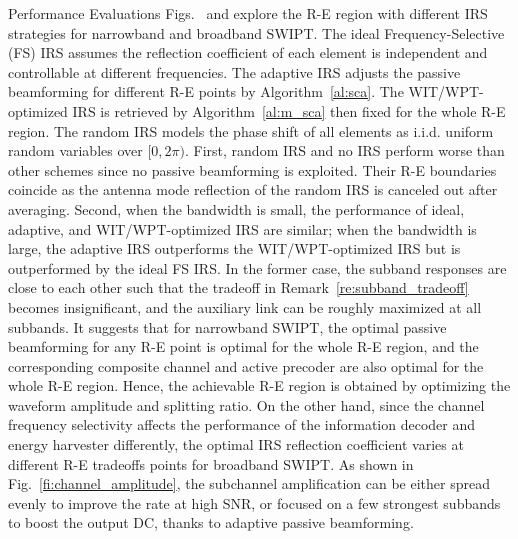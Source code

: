 \documentclass[journal]{IEEEtran}
\begin{document}
\begin{section}{Performance Evaluations}
		Figs.~ and  explore the R-E region with different IRS strategies for narrowband and broadband SWIPT. The ideal Frequency-Selective (FS) IRS assumes the reflection coefficient of each element is independent and controllable at different frequencies. The adaptive IRS adjusts the passive beamforming for different R-E points by Algorithm~\ref{al:sca}. The WIT/WPT-optimized IRS is retrieved by Algorithm~\ref{al:m_sca} then fixed for the whole R-E region. The random IRS models the phase shift of all elements as i.i.d. uniform random variables over $[0, 2\pi)$. First, random IRS and no IRS perform worse than other schemes since no passive beamforming is exploited. Their R-E boundaries coincide as the antenna mode reflection of the random IRS is canceled out after averaging. Second, when the bandwidth is small, the performance of ideal, adaptive, and WIT/WPT-optimized IRS are similar; when the bandwidth is large, the adaptive IRS outperforms the WIT/WPT-optimized IRS but is outperformed by the ideal FS IRS. In the former case, the subband responses are close to each other such that the tradeoff in Remark~\ref{re:subband_tradeoff} becomes insignificant, and the auxiliary link can be roughly maximized at all subbands. It suggests that for narrowband SWIPT, the optimal passive beamforming for any R-E point is optimal for the whole R-E region, and the corresponding composite channel and active precoder are also optimal for the whole R-E region. Hence, the achievable R-E region is obtained by optimizing the waveform amplitude and splitting ratio. On the other hand, since the channel frequency selectivity affects the performance of the information decoder and energy harvester differently, the optimal IRS reflection coefficient varies at different R-E tradeoffs points for broadband SWIPT. As shown in Fig.~\ref{fi:channel_amplitude}, the subchannel amplification can be either spread evenly to improve the rate at high SNR, or focused on a few strongest subbands to boost the output DC, thanks to adaptive passive beamforming.


\end{section}
\end{document}

